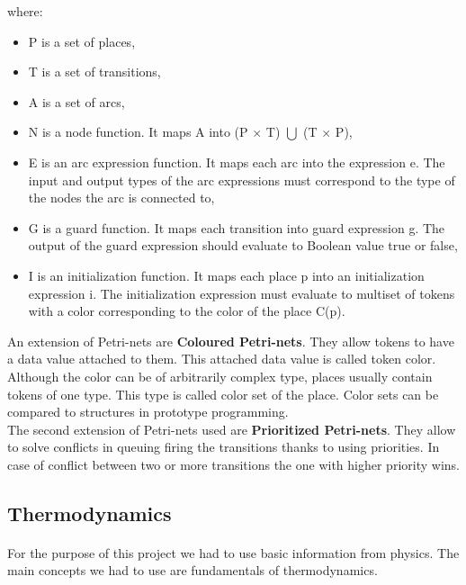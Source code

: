 \documentclass[a4paper]{article}
\begin{document}
where:
\begin{itemize}
	\setlength{\itemsep}{1pt}
	\setlength{\parskip}{0pt}
	\setlength{\parsep}{0pt}
\item P is a set of places,
\item T is a set of transitions,
\item A is a set of arcs,
\item N is a node function. It maps A into (P $\times$ T) $\bigcup$ (T $\times$ P),
\item E is an arc expression function. It maps each arc into the expression e. The input and output types of the arc expressions must correspond to the type of the nodes the arc is connected to,
\item G is a guard function. It maps each transition into guard expression g. The output of the guard expression should evaluate to Boolean value true or false,
\item I is an initialization function. It maps each place p into an initialization expression i. The initialization expression must evaluate to multiset of tokens with a color corresponding to the color of the place C(p).\\
\end{itemize}

\clearpage

An extension of Petri-nets are \textbf{Coloured Petri-nets}. They allow tokens to have a data value attached to them. This attached data value is called token color. Although the color can be of arbitrarily complex type, places usually contain tokens of one type. This type is called color set of the place. \cite{Art4} Color sets can be compared to structures in prototype programming.\\

The second extension of Petri-nets used are \textbf{Prioritized Petri-nets}. They allow to solve conflicts in queuing firing the transitions thanks to using priorities. In case of conflict between two or more transitions the one with higher priority wins.

\subsection{Thermodynamics}
\label{sec:thermodynamics}
\paragraph{}

For the purpose of this project we had to use basic information from physics. The main concepts we had to use are fundamentals of thermodynamics.\\
\end{document}
